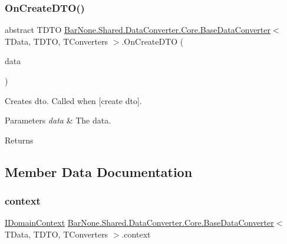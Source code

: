 \subsubsection{\texorpdfstring{On\+Create\+D\+T\+O()}{OnCreateDTO()}}
{\footnotesize\ttfamily abstract T\+D\+TO \mbox{\hyperlink{class_bar_none_1_1_shared_1_1_data_converter_1_1_core_1_1_base_data_converter}{Bar\+None.\+Shared.\+Data\+Converter.\+Core.\+Base\+Data\+Converter}}$<$ T\+Data, T\+D\+TO, T\+Converters $>$.On\+Create\+D\+TO (\begin{DoxyParamCaption}\item[{T\+Data}]{data }\end{DoxyParamCaption})\hspace{0.3cm}{\ttfamily [pure virtual]}}



Creates dto. Called when \mbox{[}create dto\mbox{]}. 


\begin{DoxyParams}{Parameters}
{\em data} & The data.\\
\hline
\end{DoxyParams}
\begin{DoxyReturn}{Returns}

\end{DoxyReturn}


\subsection{Member Data Documentation}
\mbox{\label{class_bar_none_1_1_shared_1_1_data_converter_1_1_core_1_1_base_data_converter_ae96bc28386162a9cff2a303c270a12b4}} 
\subsubsection{\texorpdfstring{context}{context}}
{\footnotesize\ttfamily \mbox{\hyperlink{interface_bar_none_1_1_shared_1_1_core_1_1_i_domain_context}{I\+Domain\+Context}} \mbox{\hyperlink{class_bar_none_1_1_shared_1_1_data_converter_1_1_core_1_1_base_data_converter}{Bar\+None.\+Shared.\+Data\+Converter.\+Core.\+Base\+Data\+Converter}}$<$ T\+Data, T\+D\+TO, T\+Converters $>$.context\hspace{0.3cm}{\ttfamily [protected]}}



